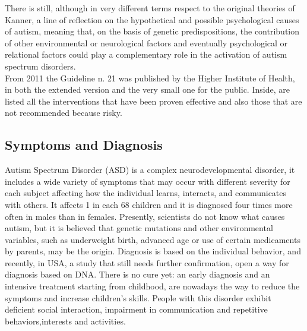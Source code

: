There is still, although in very different terms respect to the original theories of Kanner, a line of reflection on the hypothetical and possible psychological causes of autism, meaning that, on the basis of genetic predispositions, the contribution of other environmental or neurological factors and eventually psychological or relational factors could play a complementary role in the activation of autism spectrum disorders.\\
From 2011 the Guideline n. 21 was published by the Higher Institute of Health, in both the extended version and the very small one for the public. Inside, are listed all the interventions that have been proven effective and also those that are not recommended because risky.
\subsection{Symptoms and Diagnosis}
Autism Spectrum Disorder (ASD) is a complex neurodevelopmental disorder, it includes a wide variety of symptoms that may occur with different severity for each subject\cite{wall2007autism}\cite{happe2008fractionable} affecting how the individual learns, interacts, and communicates with others\cite{american2013diagnostic}.
It affects 1 in each 68 children\cite{christensen2016prevalence} and it is diagnosed four times more often in males than in females\cite{american2013diagnostic}.  Presently, scientists do not know what causes autism, but it is believed that genetic mutations and other environmental variables, such as underweight birth, advanced age or use of certain medicaments by parents, may be the origin. Diagnosis is based on the individual behavior, and recently, in USA, a study that still needs further confirmation, open a way for diagnosis based on DNA\cite{howsmon2017classification}. There is no cure yet: an early diagnosis and an intensive treatment starting from childhood, are nowadays the way to reduce the symptoms and increase children's skills.  
People with this disorder exhibit deficient social interaction, impairment in communication and repetitive behaviors,interests and activities\cite{american2013diagnostic}.\\

